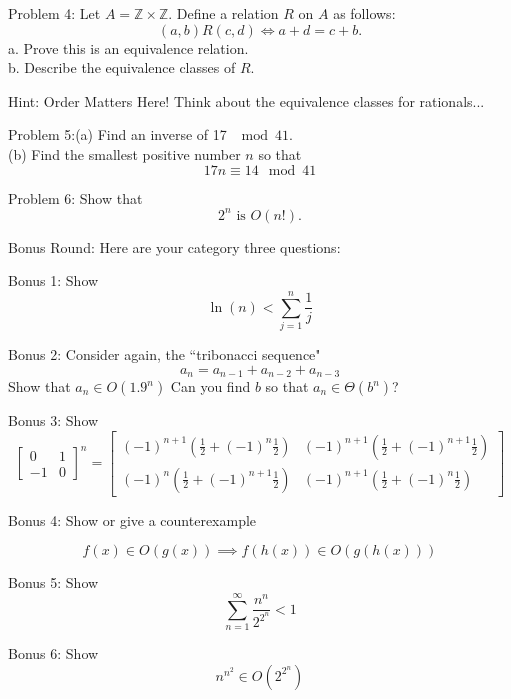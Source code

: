 \documentclass[16 pt]{amsart}
\theoremstyle{definition}
\theoremstyle{remark}
\numberwithin{equation}{subsection}
\newcommand{\Z}{\mathbb{Z}}
\begin{document}
\newpage

Problem 4: Let $A= \Z \times \Z$.  Define a relation $R$ on $A$ as follows:
\[
(a,b) R (c,d) \iff a + d = c + b.
\]
a. Prove this is an equivalence relation.\\
b. Describe the equivalence classes of $R$.

\vspace{.5in}

Hint: Order Matters Here! Think about the equivalence classes for rationals...

\newpage

Problem 5:(a) Find an inverse of 17 $\mod{41}$.\\

(b) Find the smallest positive number $n$ so that
\[
17 n \equiv 14 \mod{41}
\]

\newpage

Problem 6: Show that
\[
2^n \text{ is } O(n!).
\]
 
\newpage

Bonus Round:  Here are your category three questions:

Bonus 1: Show 
\[
\ln(n) < \sum_{j=1}^{n} \frac{1}{j}
\]

\vspace{.75in}

Bonus 2: Consider again, the ``tribonacci sequence"
\[
a_n = a_{n-1}+a_{n-2}+a_{n-3}
\]
Show that $a_n \in O(1.9^n)$ Can you find $b$ so that $a_n \in \Theta(b^n)$?

\vspace{.75in}

Bonus 3: Show
\[
\begin{bmatrix}
0 & 1 \\ -1 & 0
\end{bmatrix}^n =
\begin{bmatrix}
(-1)^{n+1}(\frac{1}{2}+(-1)^{n}\frac{1}{2}) & (-1)^{n+1}(\frac{1}{2}+(-1)^{n+1}\frac{1}{2})\\
(-1)^{n}(\frac{1}{2}+(-1)^{n+1}\frac{1}{2})
 & (-1)^{n+1}(\frac{1}{2}+(-1)^{n}\frac{1}{2})
\end{bmatrix}
\]

\vspace{.75in}

Bonus 4: Show or give a counterexample

\[
f(x) \in O(g(x)) \implies f(h(x)) \in O(g(h(x)))
\]

\vspace{.75in}

Bonus 5: Show
\[
\sum_{n=1}^{\infty} \frac{n^n}{2^{2^n}} < 1
\]


\vspace{.75in}

Bonus 6: Show
\[
n^{n^2} \in O(2^{2^n})
\]
\end{document}

